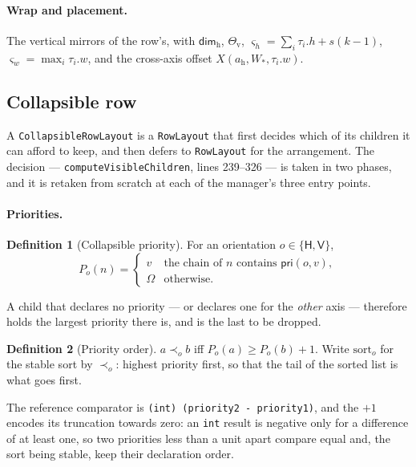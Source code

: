 \documentclass[11pt,a4paper]{article}
\newcommand{\Om}{\Omega}
\newcommand{\pri}{\mathsf{pri}}
\newcommand{\Horz}{\mathsf{H}}
\newcommand{\Vrt}{\mathsf{V}}
\newcommand{\Dimh}{\mathsf{dim}_{\mathrm{h}}}
\newcommand{\jv}[1]{\texttt{#1}}       %
\theoremstyle{definition}
\newtheorem{definition}{Definition}[section]
\theoremstyle{plain}
\theoremstyle{remark}
\begin{document}
\paragraph{Wrap and placement.}
The vertical mirrors of the row's, with $\Dimh$, $\Theta_{\mathrm{v}}$,
$\varsigma_h = \sum_i \tau_i.h + s(k-1)$, $\varsigma_w = \max_i \tau_i.w$, and
the cross-axis offset $X(a_{\mathrm{h}}, W_{\!*}, \tau_i.w)$.

\subsection{Collapsible row}
\label{sec:crow}

A \jv{CollapsibleRowLayout} is a \jv{RowLayout} that first decides which of its
children it can afford to keep, and then defers to \jv{RowLayout} for the
arrangement. The decision --- \jv{computeVisibleChildren}, lines 239--326 --- is
taken in two phases, and it is retaken from scratch at each of the manager's
three entry points.

\paragraph{Priorities.}

\begin{definition}[Collapsible priority]
For an orientation $o \in \{\Horz, \Vrt\}$,
\[
  P_o(n) = \begin{cases}
    v & \text{the chain of } n \text{ contains } \pri(o, v), \\
    \Om & \text{otherwise.}
  \end{cases}
\]
\end{definition}

A child that declares no priority --- or declares one for the \emph{other} axis
--- therefore holds the largest priority there is, and is the last to be dropped.

\begin{definition}[Priority order]
$a \prec_o b$ iff $P_o(a) \geq P_o(b) + 1$. Write $\mathrm{sort}_o$ for the
stable sort by $\prec_o$: highest priority first, so that the tail of the sorted
list is what goes first.
\end{definition}

The reference comparator is \jv{(int) (priority2 - priority1)}, and the $+1$
encodes its truncation towards zero: an \jv{int} result is negative only for a
difference of at least one, so two priorities less than a unit apart compare
equal and, the sort being stable, keep their declaration order.
\end{document}
